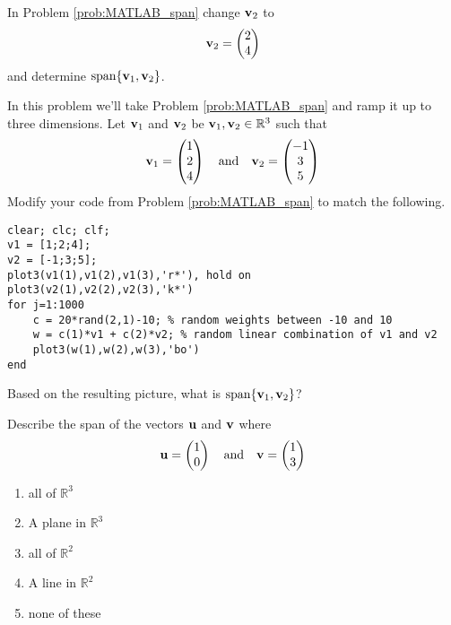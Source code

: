 \begin{problem}
    In Problem \ref{prob:MATLAB_span} change ${\bf v}_2$ to 
    \[ {\bf v}_2 = \begin{pmatrix} 2 \\ 4\end{pmatrix} \]
    and determine $\text{span}\{{\bf v}_1,{\bf v}_2\}$.
\end{problem}

\begin{problem}
    In this problem we'll take Problem \ref{prob:MATLAB_span} and ramp it up to three
    dimensions.  Let ${\bf v}_1$ and ${\bf v}_2$ be 
    ${\bf v}_1, {\bf v}_2 \in \mathbb{R}^3$ such that 
    \[ {\bf v}_1 = \begin{pmatrix} 1 \\ 2 \\ 4 \end{pmatrix} \quad \text{and} \quad {\bf v}_2 =
            \begin{pmatrix} -1 \\ 3 \\ 5 \end{pmatrix} \]
    Modify your code from Problem \ref{prob:MATLAB_span} to match the following.
\begin{lstlisting}
clear; clc; clf;
v1 = [1;2;4];
v2 = [-1;3;5];
plot3(v1(1),v1(2),v1(3),'r*'), hold on
plot3(v2(1),v2(2),v2(3),'k*')
for j=1:1000
    c = 20*rand(2,1)-10; % random weights between -10 and 10
    w = c(1)*v1 + c(2)*v2; % random linear combination of v1 and v2
    plot3(w(1),w(2),w(3),'bo')
end
\end{lstlisting}
    Based on the resulting picture, what is $\text{span}\{{\bf v}_1,{\bf v}_2\}$?
\end{problem}

\begin{problem}
    Describe the span of the vectors ${\bf u}$ and ${\bf v}$ where
    \[ {\bf u} = \begin{pmatrix} 1 \\ 0 \end{pmatrix} \quad \text{and} \quad {\bf v} =
    \begin{pmatrix} 1 \\ 3 \end{pmatrix} \]
    \begin{enumerate}
        \item all of $\mathbb{R}^3$
        \item A plane in $\mathbb{R}^3$
        \item all of $\mathbb{R}^2$
        \item A line in $\mathbb{R}^2$
        \item none of these
    \end{enumerate}
\end{problem}

